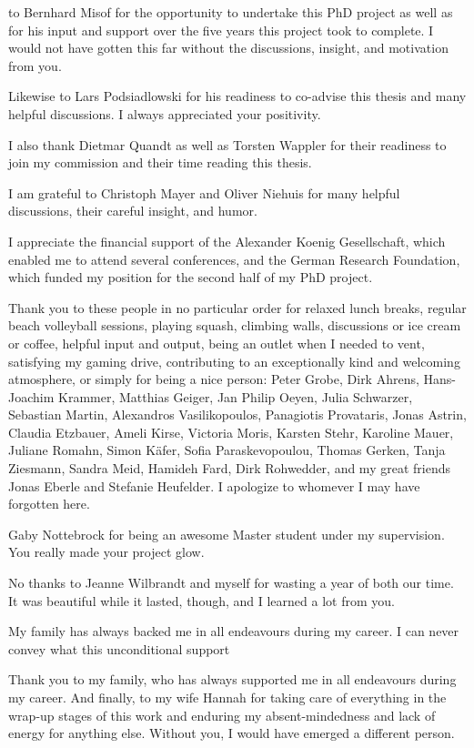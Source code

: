 
 to Bernhard Misof for the opportunity to
undertake this PhD project as well as for his input and support over the
five years this project took to complete.  I would not have gotten this
far without the discussions, insight, and motivation from you.

Likewise to Lars Podsiadlowski for his readiness to co-advise this
thesis and many helpful discussions.  I always appreciated your
positivity.

I also thank Dietmar Quandt as well as Torsten Wappler for their
readiness to join my commission and their time reading this thesis.

I am grateful to Christoph Mayer and Oliver Niehuis for many helpful
discussions, their careful insight, and humor.

I appreciate the financial support of the Alexander Koenig Gesellschaft,
which enabled me to attend several conferences, and the German Research
Foundation, which funded my position for the second half of my PhD
project.

Thank you to these people in no particular order for relaxed lunch
breaks, regular beach volleyball sessions, playing squash, climbing
walls, discussions or ice cream or coffee, helpful input and output,
being an outlet when I needed to vent, satisfying my gaming drive,
contributing to an exceptionally kind and welcoming atmosphere, or
simply for being a nice person:
%
Peter Grobe, Dirk Ahrens, Hans-Joachim Krammer, Matthias Geiger, Jan
Philip Oeyen, Julia Schwarzer, Sebastian Martin, Alexandros
Vasilikopoulos, Panagiotis Provataris, Jonas Astrin, Claudia Etzbauer,
Ameli Kirse, Victoria Moris, Karsten Stehr, Karoline Mauer, Juliane
Romahn, Simon K\"afer, Sofia Paraskevopoulou, Thomas Gerken, Tanja
Ziesmann, Sandra Meid, Hamideh Fard, Dirk Rohwedder, and my great
friends Jonas Eberle and Stefanie Heufelder.  I apologize to whomever I
may have forgotten here.

Gaby Nottebrock for being an awesome Master student under my
supervision.  You really made your project glow.

No thanks to Jeanne Wilbrandt and myself for wasting a year of both our
time.  It was beautiful while it lasted, though, and I learned a lot
from you.

My family has always backed me in all endeavours during my career.  I
can never convey what this unconditional support 

Thank you to my family, who has always supported me in all endeavours
during my career.  And finally, to my wife Hannah for taking care of
everything in the wrap-up stages of this work and enduring my
absent-mindedness and lack of energy for anything else.  Without you, I
would have emerged a different person.
